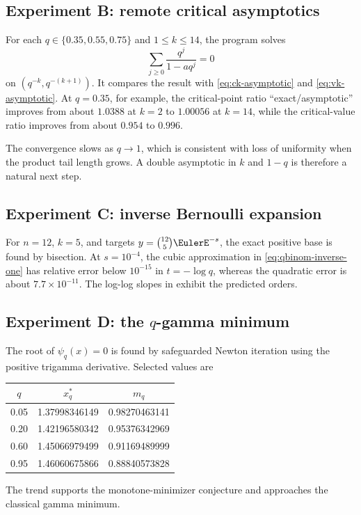 \documentclass[11pt,oneside]{article}
\theoremstyle{definition}
\theoremstyle{remark}
\theoremstyle{plain}
\theoremstyle{definition}
\theoremstyle{remark}
\numberwithin{equation}{section}
\numberwithin{figure}{section}
\numberwithin{table}{section}
\let\reportsubsection\subsection
\let\reportsubsubsection\subsubsection
\let\section\reportsubsection
\let\subsection\reportsubsubsection
\begin{document}
\section{Experiment B: remote critical asymptotics}
For each \(q\in\{0.35,0.55,0.75\}\) and \(1\le k\le14\), the program solves
\[
 \sum_{j\ge0}\frac{q^j}{1-aq^j}=0
\]
on \((q^{-k},q^{-(k+1)})\).  It compares the result with
\eqref{eq:ck-asymptotic} and \eqref{eq:vk-asymptotic}.  At \(q=0.35\), for
example, the critical-point ratio ``exact/asymptotic'' improves from about
\(1.0388\) at \(k=2\) to \(1.00056\) at \(k=14\), while the critical-value
ratio improves from about \(0.954\) to \(0.996\).

The convergence slows as \(q\to1\), which is consistent with loss of uniformity
when the product tail length grows.  A double asymptotic in \(k\) and
\(1-q\) is therefore a natural next step.

\section{Experiment C: inverse Bernoulli expansion}
For \(n=12\), \(k=5\), and targets
\(y=\binom{12}{5}\EulerE^{-s}\), the exact positive base is found by bisection.  At
\(s=10^{-4}\), the cubic approximation in
\eqref{eq:qbinom-inverse-one} has relative error below \(10^{-15}\) in
\(t=-\log q\), whereas the quadratic error is about
\(7.7\times10^{-11}\).  The log-log slopes in
 exhibit the predicted orders.

\section{Experiment D: the \texorpdfstring{\(q\)}{q}-gamma minimum}
The root of \(\psi_q(x)=0\) is found by safeguarded Newton iteration using the
positive trigamma derivative.  Selected values are
\begin{center}
\begin{tabular}{@{}ccc@{}}
\toprule
\(q\)&\(x_q^*\)&\(m_q\)\\
\midrule
0.05&1.37998346149&0.98270463141\\
0.20&1.42196580342&0.95376342969\\
0.60&1.45066979499&0.91169489999\\
0.95&1.46060675866&0.88840573828\\
\bottomrule
\end{tabular}
\end{center}
The trend supports the monotone-minimizer conjecture and approaches the
classical gamma minimum.
\end{document}
